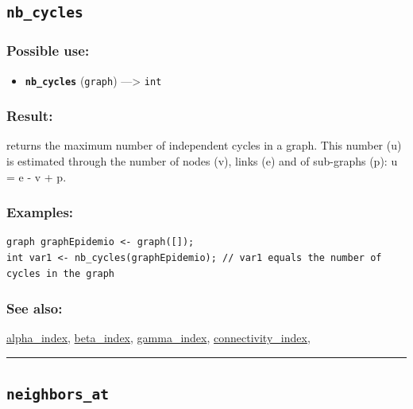 \documentclass[]{book}
\providecommand{\tightlist}{%
  \setlength{\itemsep}{0pt}\setlength{\parskip}{0pt}}
\theoremstyle{definition}
\theoremstyle{definition}
\theoremstyle{definition}
\theoremstyle{remark}
\begin{document}
\subsection{\texorpdfstring{\texttt{nb\_cycles}}{nb\_cycles}}\label{nb_cycles}

\subsubsection{Possible use:}\label{possible-use-365}

\begin{itemize}
\tightlist
\item
  \textbf{\texttt{nb\_cycles}} (\texttt{graph}) ---\textgreater{}
  \texttt{int}
\end{itemize}

\subsubsection{Result:}\label{result-353}

returns the maximum number of independent cycles in a graph. This number
(u) is estimated through the number of nodes (v), links (e) and of
sub-graphs (p): u = e - v + p.

\subsubsection{Examples:}\label{examples-252}

\begin{verbatim}
graph graphEpidemio <- graph([]);  
int var1 <- nb_cycles(graphEpidemio); // var1 equals the number of cycles in the graph
\end{verbatim}

\subsubsection{See also:}\label{see-also-145}

\href{operators-a-to-a.html\#alpha_index}{alpha\_index},
\href{operators-b-to-c.html\#beta_index}{beta\_index},
\href{operators-d-to-h.html\#gamma_index}{gamma\_index},
\href{operators-b-to-c.html\#connectivity_index}{connectivity\_index},

\begin{center}\rule{0.5\linewidth}{\linethickness}\end{center}

\subsection{\texorpdfstring{\texttt{neighbors\_at}}{neighbors\_at}}\label{neighbors_at}
\end{document}
